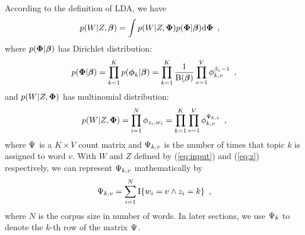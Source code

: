 According to the definition of LDA, we have
\begin{equation}
  \label{eq:term1}
  \begin{split}
    p(W|Z,\boldsymbol{\beta})
    &=
    \int p(W|Z,\boldsymbol{\Phi}) p(\boldsymbol{\Phi}|\boldsymbol{\beta}) \mathrm{d}\boldsymbol{\Phi}
    \enspace,
  \end{split}
\end{equation}
where $p(\boldsymbol{\Phi}|\boldsymbol{\beta})$ has Dirichlet distribution:
\begin{equation}
  \label{eq:dir-beta}
  p(\boldsymbol{\Phi}|\boldsymbol{\beta})
  =
  \prod_{k=1}^{K}
  p( \boldsymbol{\phi}_{k} | \boldsymbol{\beta})
  =
  \prod_{k=1}^{K}
  \frac{1}{\operatorname{B}(\boldsymbol{\beta})}
  \prod_{v=1}^{V} \phi_{k,v}^{\beta_{v}-1}
  \enspace,
\end{equation}
and $p(W|Z,\boldsymbol{\Phi})$ has multinomial distribution:
\begin{equation}
  \label{eq:w-z-phi}
  p(W|Z,\boldsymbol{\Phi})
  =
  \prod_{i=1}^N \phi_{z_i,w_i}
  =
  \prod_{k=1}^{K} \prod_{v=1}^{V} \phi_{k,v}^{\Psi_{k,v}}
  \enspace,
\end{equation}
where $\Psi_{}$ is a $K\times{}V$ count matrix and $\Psi_{k,v}$ is the
number of times that topic $k$ is assigned to word $v$.  With $W$ and
$Z$ defined by (\ref{eq:input}) and (\ref{eq:z}) respectively, we can
represent $\Psi_{k,v}$ mathematically by
\begin{equation}
  \label{eq:n-t-z}
  \Psi_{k,v} = \sum_{i=1}^N \operatorname{I}\{w_i=v \land z_i=k \}
  \enspace,
\end{equation}
where $N$ is the corpus size in number of words.  In later sections,
we use $\Psi_{k}$ to denote the $k$-th row of the matrix $\Psi_{}$.


